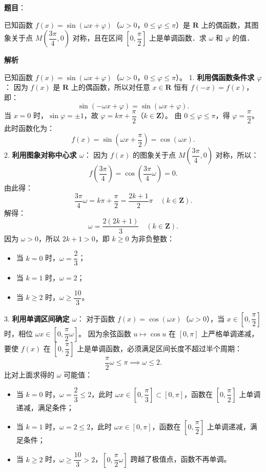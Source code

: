 \begin{answer}

\textbf{题目}：

已知函数 $f(x) = \sin(\omega x + \varphi)$（$\omega > 0$，$0 \le \varphi \le \pi$）是 $\mathbf{R}$ 上的偶函数，其图象关于点 $M\left(\dfrac{3\pi}{4}, 0\right)$ 对称，且在区间 $\left[0, \dfrac{\pi}{2}\right]$ 上是单调函数．求 $\omega$ 和 $\varphi$ 的值．

\textbf{解析}

已知函数 $f(x) = \sin(\omega x + \varphi)$（$\omega > 0$，$0 \le \varphi \le \pi$）。
1. \textbf{利用偶函数条件求 $\varphi$}：
   因为 $f(x)$ 是 $\mathbf{R}$ 上的偶函数，所以对任意 $x \in \mathbf{R}$ 恒有 $f(-x) = f(x)$，即：
\nopagebreak[4]
\[\sin(-\omega x + \varphi) = \sin(\omega x + \varphi).\]
   当 $x = 0$ 时，$\sin\varphi = \pm 1$，故 $\varphi = k\pi + \dfrac{\pi}{2}$（$k \in \mathbf{Z}$）。
   由 $0 \le \varphi \le \pi$，得 $\varphi = \dfrac{\pi}{2}$。
   此时函数化为：
\nopagebreak[4]
\[f(x) = \sin\left(\omega x + \frac{\pi}{2}\right) = \cos(\omega x).\]
2. \textbf{利用图象对称中心求 $\omega$}：
   因为 $f(x)$ 的图象关于点 $M\left(\dfrac{3\pi}{4}, 0\right)$ 对称，所以：
\nopagebreak[4]
\[f\left(\frac{3\pi}{4}\right) = \cos\left(\frac{3\pi}{4} \omega\right) = 0.\]
   由此得：
\nopagebreak[4]
\[\frac{3\pi}{4} \omega = k\pi + \frac{\pi}{2} = \frac{2k+1}{2}\pi \quad (k \in \mathbf{Z}).\]
   解得：
\nopagebreak[4]
\[\omega = \frac{2(2k+1)}{3} \quad (k \in \mathbf{Z}).\]
   因为 $\omega > 0$，所以 $2k+1 > 0$，即 $k \ge 0$ 为非负整数：
\begin{itemize}
\item 当 $k = 0$ 时，$\omega = \dfrac{2}{3}$；
\item 当 $k = 1$ 时，$\omega = 2$；
\item 当 $k \ge 2$ 时，$\omega \ge \dfrac{10}{3}$。
\end{itemize}
3. \textbf{利用单调区间确定 $\omega$}：
   对于函数 $f(x) = \cos(\omega x)$（$\omega > 0$），当 $x \in \left[0, \dfrac{\pi}{2}\right]$ 时，相位 $\omega x \in \left[0, \dfrac{\pi}{2} \omega\right]$。
   因为余弦函数 $u \mapsto \cos u$ 在 $[0, \pi]$ 上严格单调递减，要使 $f(x)$ 在 $\left[0, \dfrac{\pi}{2}\right]$ 上是单调函数，必须满足区间长度不超过半个周期：
\nopagebreak[4]
\[\frac{\pi}{2} \omega \le \pi \implies \omega \le 2.\]
   比对上面求得的 $\omega$ 可能值：
\begin{itemize}
\item 当 $k = 0$ 时，$\omega = \dfrac{2}{3} \le 2$，此时 $\omega x \in \left[0, \dfrac{\pi}{3}\right] \subset [0, \pi]$，函数在 $\left[0, \dfrac{\pi}{2}\right]$ 上单调递减，满足条件；
\item 当 $k = 1$ 时，$\omega = 2 \le 2$，此时 $\omega x \in [0, \pi]$，函数在 $\left[0, \dfrac{\pi}{2}\right]$ 上单调递减，满足条件；
\item 当 $k \ge 2$ 时，$\omega \ge \dfrac{10}{3} > 2$，$\left[0, \dfrac{\pi}{2} \omega\right]$ 跨越了极值点，函数不再单调。
\end{itemize}


\end{answer}
